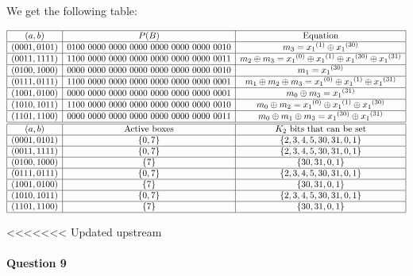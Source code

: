\documentclass[a4paper]{article}
\begin{document}
We get the following table:

\begin{equation*}
  \begin{array}{|c|c|c|}
    \hline
    (a,b) & P(B) & \text{Equation} \\
    \hline
    (0001,0101) & 0100\ 0000\ 0000\ 0000\ 0000\ 0000\ 0000\ 0010 & m_3 = {x_1}^{(1)} \oplus {x_1}^{(30)} \\
    \hline
    (0011,1111) & 1100\ 0000\ 0000\ 0000\ 0000\ 0000\ 0000\ 0011 & m_2 \oplus m_3 = {x_1}^{(0)} \oplus {x_1}^{(1)} \oplus {x_1}^{(30)} \oplus {x_1}^{(31)} \\
    \hline
    (0100,1000) & 0000\ 0000\ 0000\ 0000\ 0000\ 0000\ 0000\ 0010 & m_1 = {x_1}^{(30)} \\
    \hline
    (0111,0111) & 1100\ 0000\ 0000\ 0000\ 0000\ 0000\ 0000\ 0001 & m_1 \oplus m_2 \oplus m_3 = {x_1}^{(0)} \oplus {x_1}^{(1)} \oplus {x_1}^{(31)} \\
    \hline
    (1001,0100) & 0000\ 0000\ 0000\ 0000\ 0000\ 0000\ 0000\ 0001 & m_0 \oplus m_3 = {x_1}^{(31)} \\
    \hline
    (1010,1011) & 1100\ 0000\ 0000\ 0000\ 0000\ 0000\ 0000\ 0010 & m_0 \oplus m_2 = {x_1}^{(0)} \oplus {x_1}^{(1)} \oplus {x_1}^{(30)} \\
    \hline
    (1101,1100) & 0000\ 0000\ 0000\ 0000\ 0000\ 0000\ 0000\ 0011 & m_0 \oplus m_1 \oplus m_3 = {x_1}^{(30)} \oplus {x_1}^{(31)} \\
    \hline
    \hline
    (a,b) & \text{Active boxes} & K_2 \text{ bits that can be set} \\
    \hline
    (0001,0101) & \{0, 7\} & \{2, 3, 4, 5, 30, 31, 0, 1\} \\
    \hline
    (0011,1111) & \{0, 7\} & \{2, 3, 4, 5, 30, 31, 0, 1\} \\
    \hline
    (0100,1000) & \{7\} & \{30, 31, 0, 1\} \\
    \hline
    (0111,0111) & \{0, 7\} & \{2, 3, 4, 5, 30, 31, 0, 1\} \\
    \hline
    (1001,0100) & \{7\} & \{30, 31, 0, 1\} \\
    \hline
    (1010,1011) & \{0, 7\} & \{2, 3, 4, 5, 30, 31, 0, 1\} \\
    \hline
    (1101,1100) & \{7\} & \{30, 31, 0, 1\}  \\
    \hline
  \end{array}
\end{equation*}

<<<<<<< Updated upstream
\paragraph{Question 9}
\end{document}
